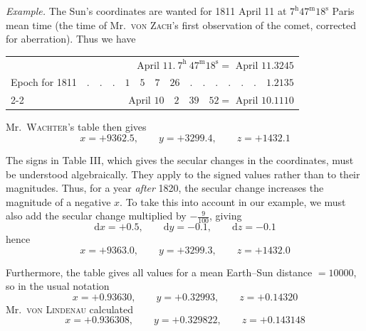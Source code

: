 \emph{Example.} The Sun’s coordinates are wanted for 1811 April 11 at $7^{\mathrm h}47^{\mathrm m}18^{\mathrm s}$ Paris mean time (the time of Mr.\ \textsc{von Zach}’s first observation of the comet, corrected for aberration). Thus we have
\begin{center}
\begin{tabular}{lr}
& April $11.\ 7^{\mathrm h}\ 47^{\mathrm m}18^{\mathrm s}=$ April $11.3245$\\
Epoch for 1811 & $.\quad.\quad.\quad1\quad5\quad7\quad26\quad.\quad.\quad.\quad.\quad.\quad.\quad1.2135$\\\cline{2-2}
& April $10\quad2\quad39\quad52=$ April $10.1110$
\end{tabular}
\end{center}
Mr.\ \textsc{Wachter}’s table then gives
\[
x=+9362.5,\qquad y=+3299.4,\qquad z=+1432.1
\]

The signs in Table III, which gives the secular changes in the coordinates, must be understood algebraically. They apply to the signed values rather than to their magnitudes. Thus, for a year \emph{after} 1820, the secular change increases the magnitude of a negative $x$. To take this into account in our example, we must also add the secular change multiplied by $-\frac9{100}$, giving
\[
\mathrm dx=+0.5,\qquad\mathrm dy=-0.1,\qquad\mathrm dz=-0.1
\]
hence
\[
x=+9363.0,\qquad y=+3299.3,\qquad z=+1432.0
\]
%

Furthermore, the table gives all values for a mean Earth–Sun distance $=10000$, so in the usual notation
\[
x=+0.93630,\qquad y=+0.32993,\qquad z=+0.14320
\]
Mr.\ \textsc{von Lindenau} calculated
\[
x=+0.936308,\qquad y=+0.329822,\qquad z=+0.143148
\]

